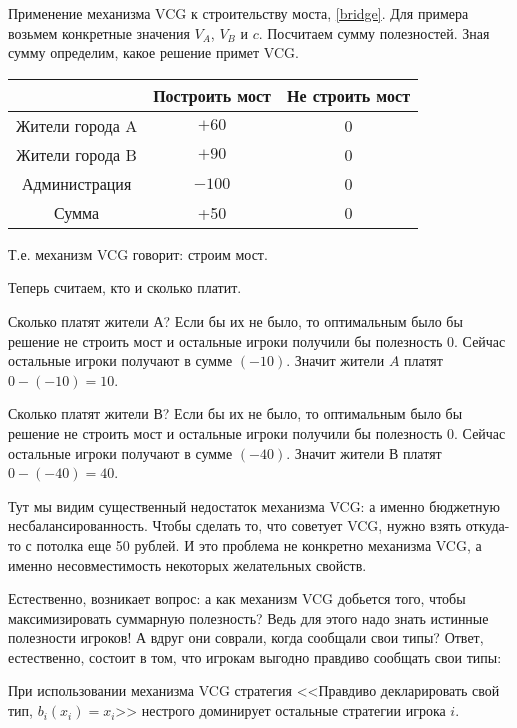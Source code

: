 \begin{myex}
Применение механизма VCG к строительству моста, \ref{bridge}. Для примера возьмем конкретные значения $ V_{A} $, $ V_{B} $ и $ c $. Посчитаем сумму полезностей. Зная сумму определим, какое решение примет VCG.

\begin{tabular}{c|cc}
& Построить мост & Не строить мост \\ 
\hline 
Жители города A & $ +60 $ & 0 \\ 
Жители города B & $ +90 $ & 0 \\ 
Администрация & $-100 $ & 0 \\
Сумма & +50 & 0 \\
\end{tabular} 

Т.е. механизм VCG говорит: строим мост.

Теперь считаем, кто и сколько платит. 

Сколько платят жители А? Если бы их не было, то оптимальным было бы решение не строить мост и остальные игроки получили бы полезность 0. Сейчас остальные игроки получают в сумме $ (-10) $. Значит жители $ A $ платят $ 0-(-10)=10 $.

Сколько платят жители В? Если бы их не было, то оптимальным было бы решение не строить мост и остальные игроки получили бы полезность 0. Сейчас остальные игроки получают в сумме $ (-40) $. Значит жители В платят $ 0-(-40)=40 $.

Тут мы видим существенный недостаток механизма VCG: а именно бюджетную несбалансированность. Чтобы сделать то, что советует VCG, нужно взять откуда-то с потолка еще 50 рублей. И это проблема не конкретно механизма VCG, а именно несовместимость некоторых желательных свойств. 
\end{myex}


Естественно, возникает вопрос: а как механизм VCG добьется того, чтобы максимизировать суммарную полезность? Ведь для этого надо знать истинные полезности игроков! А вдруг они соврали, когда сообщали свои типы? Ответ, естественно, состоит в том, что игрокам выгодно правдиво сообщать свои типы:

\begin{myth}
При использовании механизма VCG стратегия <<Правдиво декларировать свой тип, $ b_{i}(x_{i})=x_{i} $>> нестрого доминирует остальные стратегии игрока $ i $.
\end{myth}


